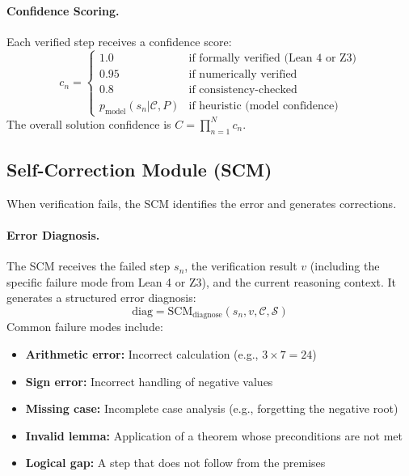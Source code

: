 \documentclass[11pt,a4paper]{article}
\begin{document}
\paragraph{Confidence Scoring.} Each verified step receives a confidence score:
\begin{equation}
    c_n = \begin{cases}
        1.0 & \text{if formally verified (Lean 4 or Z3)} \\
        0.95 & \text{if numerically verified} \\
        0.8 & \text{if consistency-checked} \\
        p_{\text{model}}(s_n | \mathcal{C}, P) & \text{if heuristic (model confidence)}
    \end{cases}
\end{equation}
The overall solution confidence is $C = \prod_{n=1}^{N} c_n$.

\subsection{Self-Correction Module (SCM)}
\label{sec:scm}

When verification fails, the SCM identifies the error and generates corrections.

\paragraph{Error Diagnosis.} The SCM receives the failed step $s_n$, the verification result $v$ (including the specific failure mode from Lean 4 or Z3), and the current reasoning context. It generates a structured error diagnosis:
\begin{equation}
    \text{diag} = \text{SCM}_{\text{diagnose}}(s_n, v, \mathcal{C}, \mathcal{S})
\end{equation}
Common failure modes include:
\begin{itemize}
    \item \textbf{Arithmetic error:} Incorrect calculation (e.g., $3 \times 7 = 24$)
    \item \textbf{Sign error:} Incorrect handling of negative values
    \item \textbf{Missing case:} Incomplete case analysis (e.g., forgetting the negative root)
    \item \textbf{Invalid lemma:} Application of a theorem whose preconditions are not met
    \item \textbf{Logical gap:} A step that does not follow from the premises
\end{itemize}
\end{document}
